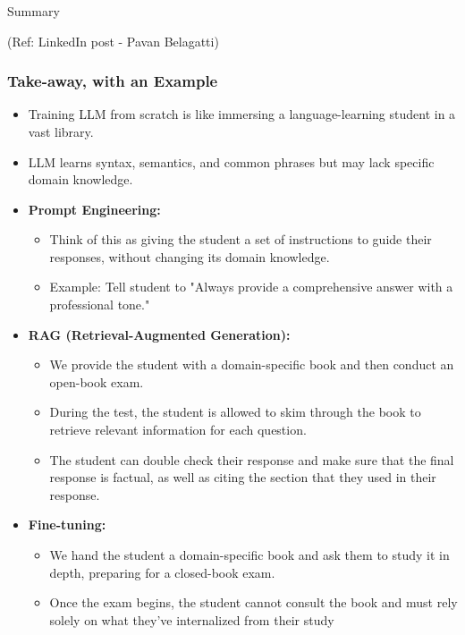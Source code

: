 \begin{frame}[fragile]\frametitle{}
\begin{center}
{\Large Summary}

{\tiny (Ref: LinkedIn post - Pavan Belagatti)}

\end{center}


\end{frame}

\begin{frame}[fragile]\frametitle{Take-away, with an Example}
  \begin{itemize}
    \item Training LLM from scratch is like immersing a language-learning student in a vast library.
    \item LLM learns syntax, semantics, and common phrases but may lack specific domain knowledge.
    \item \textbf{Prompt Engineering:}
      \begin{itemize}
        \item Think of this as giving the student a set of instructions to guide their responses, without changing its domain knowledge.
        \item Example: Tell student to "Always provide a comprehensive answer with a professional tone."
      \end{itemize}
    \item \textbf{RAG (Retrieval-Augmented Generation):}
      \begin{itemize}
        \item We provide the student with a domain-specific book and then conduct an open-book exam. 
		\item During the test, the student is allowed to skim through the book to retrieve relevant information for each question. 
		\item The student can double check their response and make sure that the final response is factual, as well as citing the section that they used in their response.
      \end{itemize}
    \item \textbf{Fine-tuning:}
      \begin{itemize}
        \item  We hand the student a domain-specific book and ask them to study it in depth, preparing for a closed-book exam. 
		\item Once the exam begins, the student cannot consult the book and must rely solely on what they've internalized from their study
      \end{itemize}
  \end{itemize}
\end{frame}

